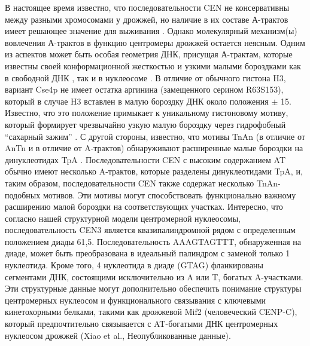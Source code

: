 В настоящее время известно, что последовательности CEN не консервативны между разными хромосомами у дрожжей, но наличие в их составе А-трактов имеет решающее значение для выживания \cite{baker_genetic_2005}. Однако молекулярный механизм(ы) вовлечения А-трактов в функцию центромеры дрожжей остается неясным. Одним из аспектов может быть особая геометрия ДНК, присущая А-трактам, которые известны своей конформационной жесткостью и узкими малыми бороздками как в свободной ДНК \cite{haran_unique_2009}, так и в нуклеосоме \cite{bao_nucleosome_2006}. В отличие от обычного гистона H3, вариант Cse4p не имеет остатка аргинина (замещенного серином R63S153), который в случае H3 вставлен в малую бороздку ДНК около положения $\pm$ 15. Известно, что это положение примыкает к уникальному гистоновому мотиву, который формирует чрезвычайно узкую малую бороздку через гидрофобный ``сахарный зажим'' \cite{wu_structural_2010}. С другой стороны, известно, что мотивы TnAn (в отличие от AnTn и в отличие от A-трактов) обнаруживают расширенные малые бороздки на динуклеотидах TpA \cite{stefl_dna_2004}. Последовательности CEN с высоким содержанием AT обычно имеют несколько A-трактов, которые разделены динуклеотидами TpA, и, таким образом, последовательности CEN также содержат несколько TnAn-подобных мотивов. Эти мотивы могут способствовать функционально важному расширению малой бороздки на соответствующих участках.
Интересно, что согласно нашей структурной модели центромерной нуклеосомы, последовательность CEN3 является квазипалиндромной рядом с определенным положением диады 61,5. Последовательность AAAGTAGTTT, обнаруженная на диаде, может быть преобразована в идеальный палиндром с заменой только 1 нуклеотида. Кроме того, 4 нуклеотида в диаде (GTAG) фланкированы сегментами ДНК, состоящими исключительно из A или T, богатых A-участками. Эти структурные данные могут дополнительно обеспечить понимание структуры центромерных нуклеосом и функционального связывания с ключевыми кинетохорными белками, такими как дрожжевой Mif2 (человеческий CENP-C), который предпочтительно связывается с AT-богатыми ДНК центромерных нуклеосом дрожжей (Xiao et al., Неопубликованные данные).

